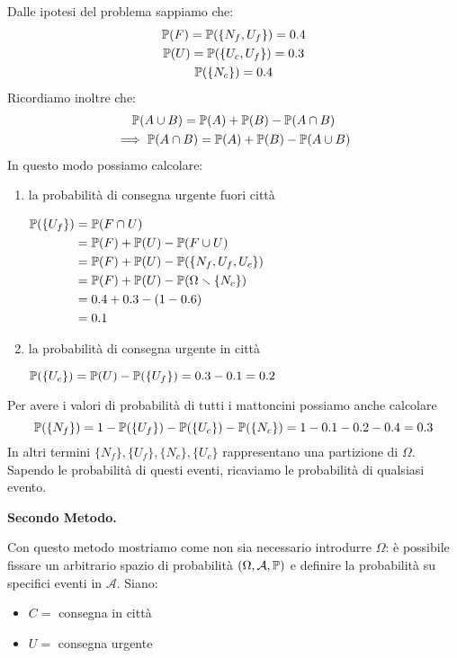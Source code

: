 Dalle ipotesi del problema sappiamo che:
\begin{gather*}
\P( F) =\P(\{N_{f} ,U_{f}\}) =0.4\\
\P( U) =\P(\{U_{c} ,U_{f}\}) =0.3\\
\P(\{N_{c}\}) =0.4
\end{gather*}
Ricordiamo inoltre che:
\begin{gather*}
\P( A\cup B) =\P( A) +\P( B) -\P( A\cap B)\\
\mathbb{\implies  P}( A\cap B) =\P( A) +\P( B) -\P( A\cup B)
\end{gather*}
In questo modo possiamo calcolare:
\begin{enumerate}
\item la probabilità di consegna urgente fuori città

$\begin{aligned}
\P(\{U_{f}\}) & =\P( F\cap U)\\
 & =\P( F) +\P( U) -\P( F\cup U)\\
 & =\P( F) +\P( U) -\P(\{N_{f} ,U_{f} ,U_{c}\})\\
 & =\P( F) +\P( U) -\P( \Omega \smallsetminus \{N_{c}\})\\
 & =0.4+0.3-( 1-0.6)\\
 & =0.1
\end{aligned}$
\item la probabilità di consegna urgente in città

$\P(\{U_{c}\}) =\P( U) -\P(\{U_{f}\}) =0.3-0.1=0.2$
\end{enumerate}
\begin{oss}
Per avere i valori di probabilità di tutti i mattoncini possiamo anche calcolare
\begin{equation*}
\P(\{N_{f}\}) =1-\P(\{U_{f}\}) -\P(\{U_{c}\}) -\P(\{N_{c}\}) =1-0.1-0.2-0.4=0.3
\end{equation*}
In altri termini $\{N_{f}\} ,\{U_{f}\} ,\{N_{c}\} ,\{U_{c}\}$ rappresentano una partizione di $\Omega $. Sapendo le probabilità di questi eventi, ricaviamo le probabilità di qualsiasi evento.
\end{oss}


\textbf{Secondo Metodo.}

Con questo metodo mostriamo come non sia necessario introdurre $\Omega $: è possibile fissare un arbitrario spazio di probabilità $( \Omega ,\mathcal{A} ,\P)$ e definire la probabilità su specifici eventi in $\mathcal{A}$. Siano:
\begin{itemize}
\item $C=$ consegna in città
\item $U=$ consegna urgente
\end{itemize}

